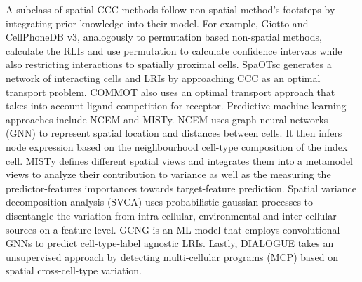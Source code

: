 A subclass of spatial CCC methods follow non-spatial method's footsteps by integrating prior-knowledge into their model. For example, Giotto and CellPhoneDB v3, analogously to permutation based non-spatial methods, calculate the RLIs and use permutation to calculate confidence intervals while also restricting interactions to spatially proximal cells. SpaOTsc generates a network of interacting cells and LRIs by approaching CCC as an optimal transport problem. COMMOT also uses an optimal transport approach that takes into account ligand competition for receptor. Predictive machine learning approaches include NCEM and MISTy. NCEM uses graph neural networks (GNN) to represent spatial location and distances between cells. It then infers node  expression based on the neighbourhood cell-type composition of the index cell. MISTy defines different spatial views and integrates them into a metamodel views to analyze their contribution to variance as well as the measuring the predictor-features importances towards target-feature prediction. Spatial variance decomposition analysis (SVCA) uses probabilistic gaussian processes to disentangle the variation from intra-cellular, environmental and inter-cellular sources on a feature-level. GCNG is an ML model that employs convolutional GNNs to predict cell-type-label agnostic LRIs. Lastly, DIALOGUE takes an unsupervised approach by detecting multi-cellular programs (MCP) based on spatial cross-cell-type variation.

